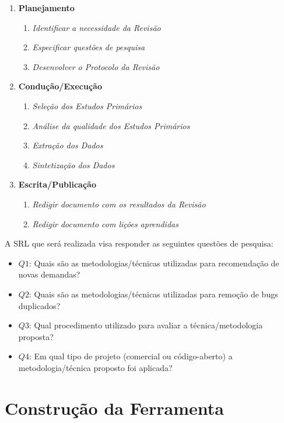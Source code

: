 \documentclass[msc,proposal,hidelot,hideabstract]{ppgccufmg} %
\begin{document}
\begin{enumerate}
  \item \textbf{Planejamento}
  \begin{enumerate}
    \item \textit{Identificar a necessidade da Revisão}
    \item \textit{Especificar questões de pesquisa}
    \item \textit{Desenvolver o Protocolo da Revisão}
  \end{enumerate}
  \item \textbf{Condução/Execução}
  \begin{enumerate}
    \item \textit{Seleção dos Estudos Primários}
    \item \textit{Análise da qualidade dos Estudos Primários}
     \item \textit{Extração dos Dados}
     \item \textit{Sintetização dos Dados}
   \end{enumerate}
  \item \textbf{Escrita/Publicação}
  \begin{enumerate}
    \item \textit{Redigir documento com os resultados da Revisão}
    \item \textit{Redigir documento com lições aprendidas}
  \end{enumerate}
\end{enumerate}

A SRL que será realizada visa responder as seguintes questões de
pesquisa:

\begin{itemize}
  \item \textbf{$Q1$}: Quais são as metodologias/técnicas utilizadas para
    recomendação de novas demandas?
  \item \textbf{$Q2$}: Quais são as metodologias/técnicas utilizadas para
    remoção de bugs duplicados?
    \item \textbf{$Q3$}: Qual procedimento utilizado para avaliar a
    técnica/metodologia proposta?
  \item \textbf{$Q4$}: Em qual tipo de projeto (comercial ou código-aberto) a
    metodologia/técnica proposto foi aplicada?
\end{itemize}

\section{Construção da Ferramenta}
\label{sec:prova-conceito}
\end{document}
